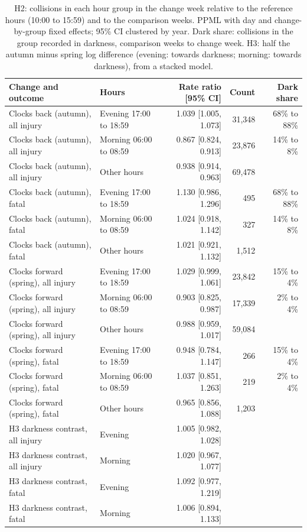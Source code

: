 \documentclass[11pt,a4paper]{article}
\begin{document}
\begin{table}[tbp]\centering\footnotesize\caption{H2: collisions in each hour group in the change week relative to the reference hours (10:00 to 15:59) and to the comparison weeks. PPML with day and change-by-group fixed effects; 95\% CI clustered by year. Dark share: collisions in the group recorded in darkness, comparison weeks to change week. H3: half the autumn minus spring log difference (evening: towards darkness; morning: towards darkness), from a stacked model.}\label{tab:h2}\begin{tabular}{llrrr}\toprule Change and outcome & Hours & Rate ratio [95\% CI] & Count & Dark share\\\midrule
Clocks back (autumn), all injury & Evening 17:00 to 18:59 & 1.039 [1.005, 1.073] & 31,348 & 68\% to 88\%\\
Clocks back (autumn), all injury & Morning 06:00 to 08:59 & 0.867 [0.824, 0.913] & 23,876 & 14\% to 8\%\\
Clocks back (autumn), all injury & Other hours & 0.938 [0.914, 0.963] & 69,478 & \\
Clocks back (autumn), fatal & Evening 17:00 to 18:59 & 1.130 [0.986, 1.296] & 495 & 68\% to 88\%\\
Clocks back (autumn), fatal & Morning 06:00 to 08:59 & 1.024 [0.918, 1.142] & 327 & 14\% to 8\%\\
Clocks back (autumn), fatal & Other hours & 1.021 [0.921, 1.132] & 1,512 & \\
\midrule
Clocks forward (spring), all injury & Evening 17:00 to 18:59 & 1.029 [0.999, 1.061] & 23,842 & 15\% to 4\%\\
Clocks forward (spring), all injury & Morning 06:00 to 08:59 & 0.903 [0.825, 0.987] & 17,339 & 2\% to 4\%\\
Clocks forward (spring), all injury & Other hours & 0.988 [0.959, 1.017] & 59,084 & \\
Clocks forward (spring), fatal & Evening 17:00 to 18:59 & 0.948 [0.784, 1.147] & 266 & 15\% to 4\%\\
Clocks forward (spring), fatal & Morning 06:00 to 08:59 & 1.037 [0.851, 1.263] & 219 & 2\% to 4\%\\
Clocks forward (spring), fatal & Other hours & 0.965 [0.856, 1.088] & 1,203 & \\
\midrule
H3 darkness contrast, all injury & Evening & 1.005 [0.982, 1.028] & & \\
H3 darkness contrast, all injury & Morning & 1.020 [0.967, 1.077] & & \\
H3 darkness contrast, fatal & Evening & 1.092 [0.977, 1.219] & & \\
H3 darkness contrast, fatal & Morning & 1.006 [0.894, 1.133] & & \\
\bottomrule\end{tabular}\end{table}
\end{document}
